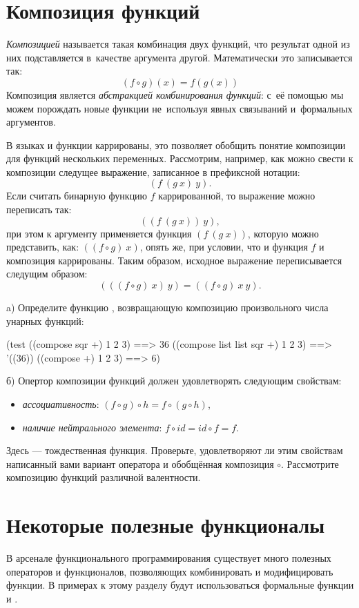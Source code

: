 \section{Композиция функций}%
%
\emph{Композицией} называется такая комбинация двух функций, что результат одной из них подставляется в~качестве аргумента другой. Математически это записывается так:$$(f \circ g)(x) = f(g(x))$$
Композиция является \emph{абстракцией комбинирования функций}: с~её помощью мы можем порождать новые функции не~используя явных связываний и~формальных аргументов.

В языках \Scheme и  функции каррированы, это позволяет обобщить понятие композиции  для функций нескольких переменных. Рассмотрим, например, как можно свести к композиции следущее выражение, записанное в префиксной нотации:
$$(f~(g~x)~y).$$
Если считать бинарную функцию $f$ каррированной, то выражение можно переписать так:
$$((f~(g~x))~y),$$
при этом к аргументу  применяется функция $(f~(g~x))$, которую можно представить, как: $((f\circ g)~x)$, опять же, при условии, что и функция $f$ и композиция каррированы. Таким образом, исходное выражение переписывается следущим образом: $$(((f \circ g)~x)~y) = ((f \circ g)~x~y).$$

\newpage
\begin{Assignment}
a) Определите функцию , возвращающую композицию произвольного числа унарных функций:
\begin{Specification}
(test
  ((compose sqr +) 1 2 3)           ==> 36
  ((compose list list sqr +) 1 2 3) ==> '((36))
  ((compose +) 1 2 3)               ==> 6)
\end{Specification}

б) Опертор композиции функций должен удовлетворять следующим свойствам:
\begin{itemize}
  \item \emph{ассоциативность}: $(f \circ g) \circ h = f \circ (g \circ h)$,
  \item \emph{наличие нейтрального элемента}: $f \circ id = id \circ f = f$.
\end{itemize}
Здесь  --- тождественная функция.
Проверьте, удовлетворяют ли этим свойствам написанный вами вариант оператора  и обобщённая композиция $\circ$. Рассмотрите  композицию функций различной валентности.
\end{Assignment}


\section{Некоторые полезные функционалы}\label{operators}%
В арсенале функционального программирования существует много полезных операторов и функционалов, позволяющих комбинировать и модифицировать функции. В примерах к этому разделу будут использоваться формальные функции  и .

